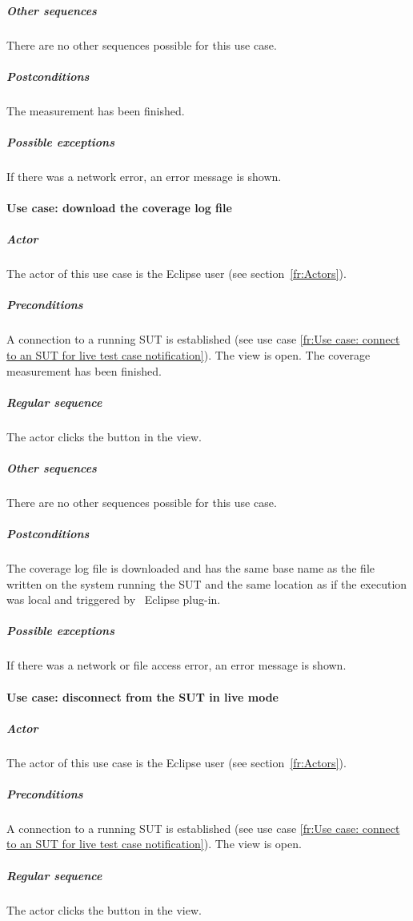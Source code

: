 \subparagraph{Other sequences}
There are no other sequences possible for this use case.

\subparagraph{Postconditions}
The measurement has been finished.

\subparagraph{Possible exceptions}
If there was a network error, an error message is shown.

\paragraph{Use case: download the coverage log file} \label{fr:Use case: download the coverage log file}

\subparagraph{Actor} The actor of this use case is the Eclipse user
(see section~\ref{fr:Actors}).

\subparagraph{Preconditions} A connection to a running SUT is
established (see use case \ref{fr:Use case: connect to an SUT for live
  test case notification}). The  view is
open. The coverage measurement has been finished.

\subparagraph{Regular sequence} The actor clicks the 
button in the  view.

\subparagraph{Other sequences}
There are no other sequences possible for this use case.

\subparagraph{Postconditions} The coverage log file is downloaded and has the same
base name as the file written on the system running the SUT and the
same location as if the execution was local and triggered by \gbt\
Eclipse plug-in.

\subparagraph{Possible exceptions} If there was a network or file
access error, an error message is shown.

\paragraph{Use case: disconnect from the SUT in live mode} \label{fr:Use case: disconnect from the SUT in live mode}

\subparagraph{Actor} The actor of this use case is the Eclipse user
(see section~\ref{fr:Actors}).

\subparagraph{Preconditions} A connection to a running SUT is
established (see use case \ref{fr:Use case: connect to an SUT for live
  test case notification}). The  view is
open.

\subparagraph{Regular sequence} The actor clicks the 
button in the \eclui{Test Case Notification} view.

